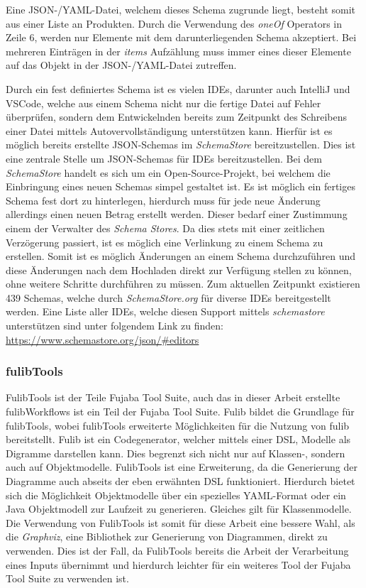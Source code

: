 Eine JSON-/YAML-Datei, welchem dieses Schema zugrunde liegt, besteht somit aus einer Liste an Produkten.
Durch die Verwendung des \textit{oneOf} Operators in Zeile 6, werden nur Elemente mit dem darunterliegenden Schema akzeptiert.
Bei mehreren Einträgen in der \textit{items} Aufzählung muss immer eines dieser Elemente auf das Objekt in der JSON-/YAML-Datei zutreffen.



Durch ein fest definiertes Schema ist es vielen IDEs, darunter auch IntelliJ und VSCode, welche
aus einem Schema nicht nur die fertige Datei auf Fehler überprüfen, sondern dem Entwickelnden bereits
zum Zeitpunkt des Schreibens einer Datei mittels Autovervollständigung unterstützen kann.
Hierfür ist es möglich bereits erstellte JSON-Schemas im \textit{SchemaStore} bereitzustellen.
Dies ist eine zentrale Stelle um JSON-Schemas für IDEs bereitzustellen.
Bei dem \textit{SchemaStore} handelt es sich um ein Open-Source-Projekt, bei welchem die Einbringung eines neuen Schemas simpel gestaltet ist.
Es ist möglich ein fertiges Schema fest dort zu hinterlegen, hierdurch muss für jede neue Änderung allerdings einen neuen Betrag erstellt werden.
Dieser bedarf einer Zustimmung einem der Verwalter des \textit{Schema Stores}.
Da dies stets mit einer zeitlichen Verzögerung passiert, ist es möglich eine Verlinkung zu einem Schema zu erstellen.
Somit ist es möglich Änderungen an einem Schema durchzuführen und diese Änderungen nach dem Hochladen direkt zur Verfügung stellen zu können, ohne weitere Schritte durchführen zu müssen.
Zum aktuellen Zeitpunkt existieren 439 Schemas, welche durch \textit{SchemaStore.org} für diverse IDEs bereitgestellt werden.\cite*{schemaStore}
Eine Liste aller IDEs, welche diesen Support mittels \textit{schemastore} unterstützen sind unter folgendem
Link zu finden: \url{https://www.schemastore.org/json/#editors}

\subsubsection{fulibTools}
FulibTools ist der Teile Fujaba Tool Suite, auch das in dieser Arbeit erstellte fulibWorkflows ist ein Teil der Fujaba Tool Suite.
Fulib bildet die Grundlage für fulibTools, wobei fulibTools erweiterte Möglichkeiten für die Nutzung von fulib bereitstellt.
Fulib ist ein Codegenerator, welcher mittels einer \ac{DSL}, Modelle als Digramme darstellen kann.\cite*{fulib}
Dies begrenzt sich nicht nur auf Klassen-, sondern auch auf Objektmodelle.
FulibTools ist eine Erweiterung, da die Generierung der Diagramme auch abseits der eben erwähnten DSL funktioniert.\cite*{fulibTools}
Hierdurch bietet sich die Möglichkeit Objektmodelle über ein spezielles YAML-Format oder ein Java Objektmodell zur Laufzeit zu generieren.
Gleiches gilt für Klassenmodelle.
Die Verwendung von FulibTools ist somit für diese Arbeit eine bessere Wahl, als die \textit{Graphviz}, eine Bibliothek zur Generierung von Diagrammen, direkt zu verwenden.
Dies ist der Fall, da FulibTools bereits die Arbeit der Verarbeitung eines Inputs übernimmt und hierdurch leichter für ein weiteres Tool der Fujaba Tool Suite zu verwenden ist.
